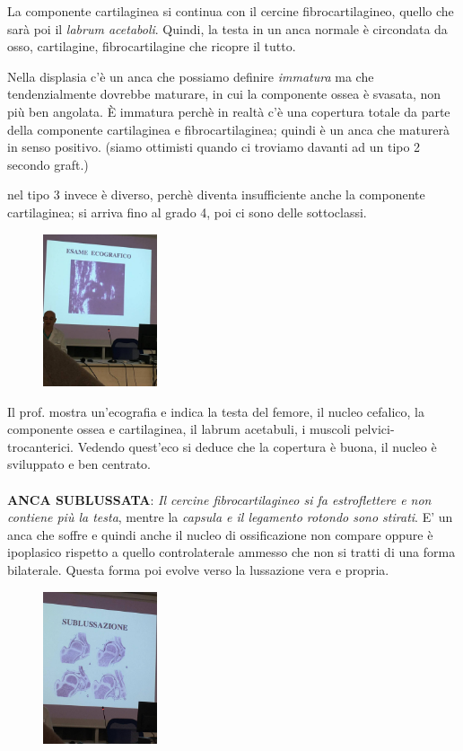 La componente cartilaginea si continua con il cercine fibrocartilagineo, quello che sarà poi il \emph{labrum acetaboli}. Quindi, la testa in un anca normale è circondata da osso, cartilagine, fibrocartilagine che ricopre il tutto.

Nella displasia c'è un anca che possiamo definire \emph{immatura} ma che tendenzialmente dovrebbe maturare, in cui la componente ossea è svasata, non più ben angolata. È immatura perchè in realtà c'è una copertura totale da parte della componente cartilaginea e fibrocartilaginea; quindi è un anca che maturerà in senso positivo. (siamo ottimisti quando ci troviamo davanti ad un tipo 2 secondo graft.)

nel tipo 3 invece è diverso, perchè diventa insufficiente anche la componente cartilaginea; si arriva fino al grado 4, poi ci sono delle sottoclassi.

\begin{figure}[!ht]
\centering
\includegraphics[width=0.3\textwidth]{018/image10.jpeg}
\end{figure}

Il prof. mostra un'ecografia e indica la testa del femore, il nucleo cefalico, la componente ossea e cartilaginea, il labrum acetabuli, i muscoli pelvici-trocanterici. Vedendo quest'eco si deduce che la copertura è buona, il nucleo è sviluppato e ben centrato.
\\\\
\textbf{ANCA SUBLUSSATA}: \emph{Il cercine fibrocartilagineo si fa estroflettere e non contiene più la testa}, mentre la \emph{capsula e il legamento rotondo sono stirati}. E' un anca che soffre e quindi anche il nucleo di ossificazione non compare oppure è ipoplasico rispetto a quello controlaterale ammesso che non si tratti di una forma bilaterale. Questa forma poi evolve verso la lussazione vera e propria.

\begin{figure}[!ht]
\centering
\includegraphics[width=0.3\textwidth]{018/image11.jpeg}
\end{figure}

